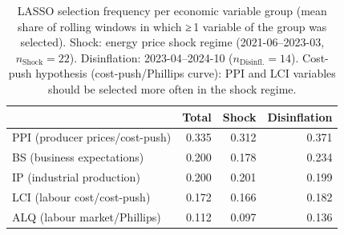 \begin{table}
\caption{LASSO selection frequency per economic variable group (mean share of rolling windows in which ≥\,1 variable of the group was selected). Shock: energy price shock regime (2021-06--2023-03, $n_{\text{Shock}}=22$). Disinflation: 2023-04--2024-10 ($n_{\text{Disinfl.}}=14$). Cost-push hypothesis (cost-push/Phillips curve): PPI and LCI variables should be selected more often in the shock regime.}
\label{tab:selection_economic}
\begin{tabular}{lrrr}
\toprule
 & Total & Shock & Disinflation \\
\midrule
PPI (producer prices/cost-push) & 0.335 & 0.312 & 0.371 \\
BS (business expectations) & 0.200 & 0.178 & 0.234 \\
IP (industrial production) & 0.200 & 0.201 & 0.199 \\
LCI (labour cost/cost-push) & 0.172 & 0.166 & 0.182 \\
ALQ (labour market/Phillips) & 0.112 & 0.097 & 0.136 \\
\bottomrule
\end{tabular}
\end{table}
